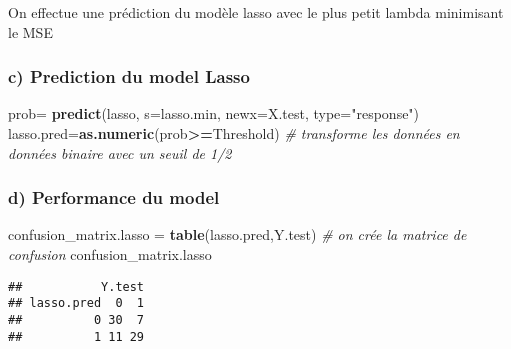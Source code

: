 \documentclass[
]{article}
\newenvironment{Shaded}{\begin{snugshade}}{\end{snugshade}}
\newcommand{\CommentTok}[1]{\textcolor[rgb]{0.56,0.35,0.01}{\textit{#1}}}
\newcommand{\DataTypeTok}[1]{\textcolor[rgb]{0.13,0.29,0.53}{#1}}
\newcommand{\KeywordTok}[1]{\textcolor[rgb]{0.13,0.29,0.53}{\textbf{#1}}}
\newcommand{\NormalTok}[1]{#1}
\newcommand{\OperatorTok}[1]{\textcolor[rgb]{0.81,0.36,0.00}{\textbf{#1}}}
\newcommand{\StringTok}[1]{\textcolor[rgb]{0.31,0.60,0.02}{#1}}
\begin{document}
\begin{Shaded}
\end{Shaded}

On effectue une prédiction du modèle lasso avec le plus petit lambda
minimisant le MSE

\hypertarget{c-prediction-du-model-lasso}{%
\subsubsection{c) Prediction du model
Lasso}\label{c-prediction-du-model-lasso}}

\begin{Shaded}
\begin{Highlighting}[]
\NormalTok{prob=}\StringTok{ }\KeywordTok{predict}\NormalTok{(lasso, }\DataTypeTok{s=}\NormalTok{lasso.min, }\DataTypeTok{newx=}\NormalTok{X.test, }\DataTypeTok{type=}\StringTok{"response"}\NormalTok{)}
\NormalTok{lasso.pred=}\KeywordTok{as.numeric}\NormalTok{(prob}\OperatorTok{>=}\NormalTok{Threshold) }\CommentTok{# transforme les données en données binaire avec un seuil de 1/2}
\end{Highlighting}
\end{Shaded}

\hypertarget{d-performance-du-model-1}{%
\subsubsection{d) Performance du model}\label{d-performance-du-model-1}}

\begin{Shaded}
\begin{Highlighting}[]
\NormalTok{confusion_matrix.lasso =}\StringTok{ }\KeywordTok{table}\NormalTok{(lasso.pred,Y.test) }\CommentTok{# on crée la matrice de confusion }
\NormalTok{confusion_matrix.lasso}
\end{Highlighting}
\end{Shaded}

\begin{verbatim}
##           Y.test
## lasso.pred  0  1
##          0 30  7
##          1 11 29
\end{verbatim}
\end{document}
